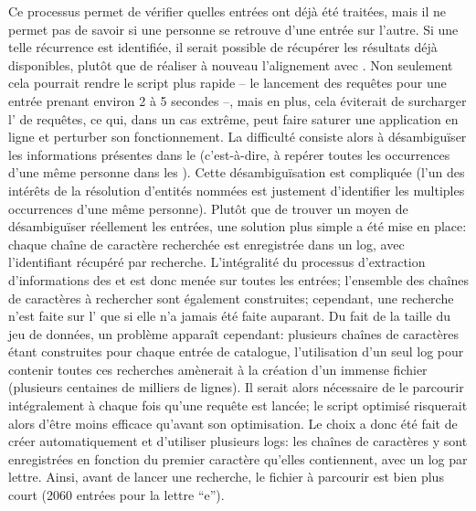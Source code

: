 Ce processus permet de vérifier quelles entrées ont déjà été traitées, mais il ne permet pas de savoir si une personne se retrouve d'une entrée sur l'autre. Si une telle récurrence est identifiée, il serait possible de récupérer les résultats déjà disponibles, plutôt que de réaliser à nouveau l'alignement avec \wkd{}. Non seulement cela pourrait rendre le script plus rapide -- le lancement des requêtes pour une entrée prenant environ 2 à 5 secondes --, mais en plus, cela éviterait de surcharger l'\api{} de requêtes, ce qui, dans un cas extrême, peut faire saturer une application en ligne et perturber son fonctionnement. La difficulté consiste alors à désambiguïser les informations présentes dans le \tname{} (c'est-à-dire, à repérer toutes les occurrences d'une même personne dans les \tname{}). Cette désambiguïsation est compliquée (l'un des intérêts de la résolution d'entités nommées est justement d'identifier les multiples occurrences d'une même personne). Plutôt que de trouver un moyen de désambiguïser réellement les entrées, une solution plus simple a été mise en place: chaque chaîne de caractère recherchée est enregistrée dans un \gls{log}, avec l'identifiant \wkd{} récupéré par recherche. L'intégralité du processus d'extraction d'informations des \tname{} et \ttrait{} est donc menée sur toutes les entrées; l'ensemble des chaînes de caractères à rechercher sont également construites; cependant, une recherche n'est faite sur l'\api{} que si elle n'a jamais été faite auparant. Du fait de la taille du jeu de données, un problème apparaît cependant: plusieurs chaînes de caractères étant construites pour chaque entrée de catalogue, l'utilisation d'un seul \gls{log} pour contenir toutes ces recherches amènerait à la création d'un immense fichier (plusieurs centaines de milliers de lignes). Il serait alors nécessaire de le parcourir intégralement à chaque fois qu'une requête est lancée; le script optimisé risquerait alors d'être moins efficace qu'avant son optimisation. Le choix a donc été fait de créer automatiquement et d'utiliser plusieurs \glspl{log}: les chaînes de caractères y sont enregistrées en fonction du premier caractère qu'elles contiennent, avec un \gls{log} par lettre. Ainsi, avant de lancer une recherche, le fichier à parcourir est bien plus court (2060 entrées pour la lettre \enquote{e}).

